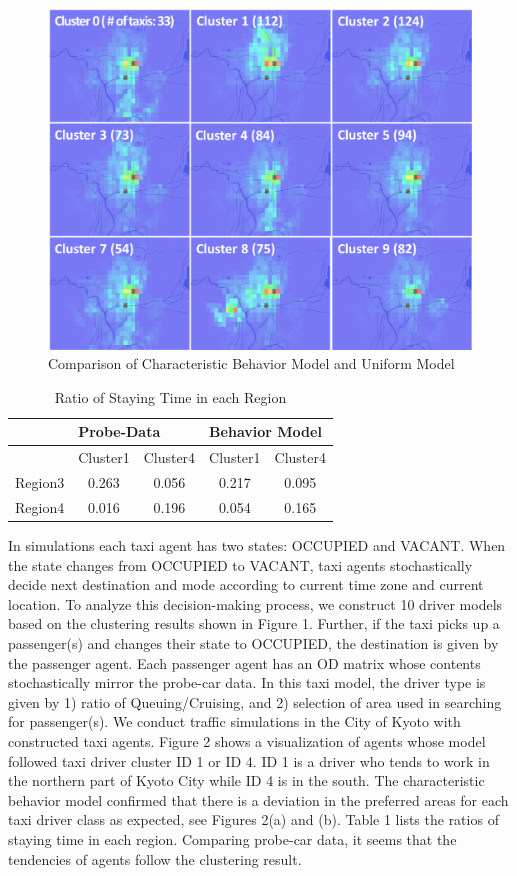 \begin{figure}
  \centering
  \includegraphics[width=.7\linewidth]{Figs.hatto/fig-hatto-02.eps}
  \caption{Comparison of Characteristic Behavior Model and Uniform Model}
  \label{fig:Figs.hatto/fig-hatto-02.eps}
\end{figure}

\begin{table}[]
\centering
\caption{Ratio of Staying Time in each Region}
\label{tbl:ratio-of-staying}
\begin{tabular}{|c|c|c|c|c|}
        \hline
        & \multicolumn{2}{|l|}{Probe-Data} & \multicolumn{2}{|l|}{Behavior Model} \\
        \hline
        & Cluster1       & Cluster4      & Cluster1         & Cluster4        \\
        \hline
Region3 & 0.263          & 0.056         & 0.217            & 0.095           \\
        \hline
Region4 & 0.016          & 0.196         & 0.054            & 0.165          \\
        \hline
\end{tabular}
\end{table}

In simulations each taxi agent has two states: OCCUPIED and VACANT. When the state changes from OCCUPIED to VACANT, taxi agents stochastically decide next destination and mode according to current time zone and current location. To analyze this decision-making process, we construct 10 driver models based on the clustering results shown in Figure 1. Further, if the taxi picks up a passenger(s) and changes their state to OCCUPIED, the destination is given by the passenger agent. Each passenger agent has an OD matrix whose contents stochastically mirror the probe-car data. In this taxi model, the driver type is given by 1) ratio of Queuing/Cruising, and 2) selection of area used in searching for passenger(s).
We conduct traffic simulations in the City of Kyoto with constructed taxi agents.
Figure 2 shows a visualization of agents whose model followed taxi driver cluster ID 1 or ID 4. ID 1 is a driver who tends to work in the northern part of Kyoto City while ID 4 is in the south. The characteristic behavior model confirmed that there is a deviation in the preferred areas for each taxi driver class as expected, see Figures 2(a) and (b). Table 1 lists the ratios of staying time in each region. Comparing probe-car data, it seems that the tendencies of agents follow the clustering result.
